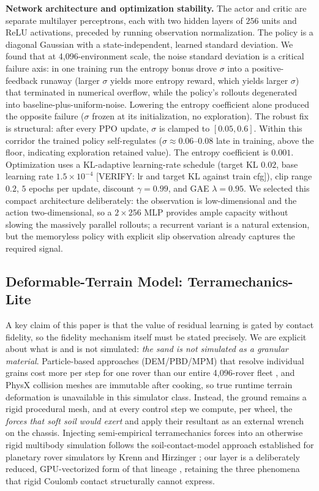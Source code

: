 \documentclass[conference]{IEEEtran}
\newcommand{\verify}[1]{\textcolor{BrickRed}{[VERIFY: #1]}}
\begin{document}
\vspace{1mm}
\noindent\textbf{Network architecture and optimization stability.} The actor and critic are separate multilayer perceptrons, each with two hidden layers of $256$ units and ReLU activations, preceded by running observation normalization. The policy is a diagonal Gaussian with a state-independent, learned standard deviation. We found that at 4{,}096-environment scale, the noise standard deviation is a critical failure axis: in one training run the entropy bonus drove $\sigma$ into a positive-feedback runaway (larger $\sigma$ yields more entropy reward, which yields larger $\sigma$) that terminated in numerical overflow, while the policy's rollouts degenerated into baseline-plus-uniform-noise. Lowering the entropy coefficient alone produced the opposite failure ($\sigma$ frozen at its initialization, no exploration). The robust fix is structural: after every PPO update, $\sigma$ is clamped to $[0.05, 0.6]$. Within this corridor the trained policy self-regulates ($\sigma \approx 0.06$--$0.08$ late in training, above the floor, indicating exploration retained value). The entropy coefficient is $0.001$. Optimization uses a KL-adaptive learning-rate schedule (target KL $0.02$, base learning rate $1.5\times10^{-4}$ \verify{lr and target KL against train cfg}), clip range $0.2$, $5$ epochs per update, discount $\gamma=0.99$, and GAE $\lambda=0.95$. We selected this compact architecture deliberately: the observation is low-dimensional and the action two-dimensional, so a $2\times256$ MLP provides ample capacity without slowing the massively parallel rollouts; a recurrent variant \cite{alcayaga2025lstm} is a natural extension, but the memoryless policy with explicit slip observation already captures the required signal.

\subsection{Deformable-Terrain Model: Terramechanics-Lite}
\label{sec:soil}
A key claim of this paper is that the value of residual learning is gated by contact fidelity, so the fidelity mechanism itself must be stated precisely. We are explicit about what is and is not simulated: \emph{the sand is not simulated as a granular material}. Particle-based approaches (DEM/PBD/MPM) that resolve individual grains cost more per step for one rover than our entire 4{,}096-rover fleet \cite{orsula2025sim2dust}, and PhysX collision meshes are immutable after cooking, so true runtime terrain deformation is unavailable in this simulator class. Instead, the ground remains a rigid procedural mesh, and at every control step we compute, per wheel, the \emph{forces that soft soil would exert} and apply their resultant as an external wrench on the chassis. Injecting semi-empirical terramechanics forces into an otherwise rigid multibody simulation follows the soil-contact-model approach established for planetary rover simulators by Krenn and Hirzinger \cite{krenn2009scm}; our layer is a deliberately reduced, GPU-vectorized form of that lineage \cite{bekker1969introduction, wong2008theory, ishigami2007terramechanics, taheri2015technical}, retaining the three phenomena that rigid Coulomb contact structurally cannot express.
\end{document}

